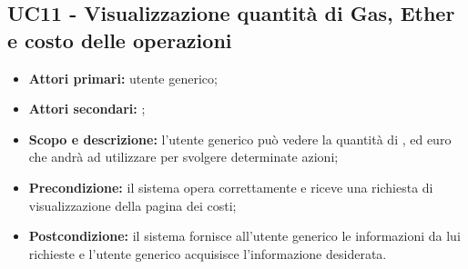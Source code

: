 \documentclass[AnalisiDeiRequisiti.tex]{subfiles}
\begin{document}
\subsection{UC11 - Visualizzazione quantità di Gas, Ether e costo delle operazioni}
\begin{itemize}
	\item \textbf{Attori primari:} utente generico;
	\item \textbf{Attori secondari:} ;
	\item \textbf{Scopo e descrizione:} l'utente generico può vedere la quantità di ,  ed euro che andrà ad utilizzare per svolgere determinate azioni;
	\item \textbf{Precondizione:} il sistema opera correttamente e riceve una richiesta di visualizzazione della pagina dei costi;
	\item \textbf{Postcondizione:} il sistema fornisce all'utente generico le informazioni da lui richieste e l'utente generico acquisisce l'informazione desiderata.
\end{itemize}
\end{document}
